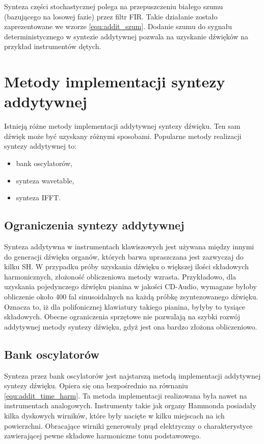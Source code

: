Synteza części stochastycznej polega na przepuszczeniu białego szumu (bazującego na losowej fazie) przez filtr FIR. Takie działanie zostało zaprezentowane we wzorze \ref{equ:addit_szum}.
Dodanie szumu do sygnału deterministycznego w syntezie addytywnej pozwala na uzyskanie dźwięków na przykład instrumentów dętych.

\section{Metody implementacji syntezy addytywnej}

Istnieją różne metody implementacji addytywnej syntezy dźwięku. Ten sam dźwięk może być uzyskany różnymi sposobami. Popularne metody realizacji syntezy addytywnej to:
\begin{itemize}
	\item bank oscylatorów,
	\item synteza wavetable,
	\item synteza IFFT.
\end{itemize}

\subsection{Ograniczenia syntezy addytywnej} \label{addit_ograniczenia}
Synteza addytywna w instrumentach klawiszowych jest używana między innymi do generacji dźwięku organów, których barwa upraszczana jest zazwyczaj do kilku SH. W przypadku próby uzyskania dźwięku o większej ilości składowych harmonicznych, złożoność obliczeniowa metody wzrasta.
Przykładowo, dla uzyskania pojedynczego dźwięku pianina w jakości CD-Audio,
wymagane byłoby obliczenie około 400 fal sinusoidalnych na każdą próbkę zsyntezowanego dźwięku. Oznacza to, iż dla polifonicznej klawiatury takiego pianina, byłyby to tysiące składowych. Obecne ograniczenia sprzętowe nie pozwalają na szybki rozwój addytywnej metody syntezy dźwięku, gdyż jest ona bardzo złożona obliczeniowo.

\subsection{Bank oscylatorów}
Synteza przez bank oscylatorów jest najstarszą metodą implementacji addytywnej syntezy dźwięku. Opiera się ona bezpośrednio na równaniu \ref{equ:addit_time_harm}.
Ta metoda implementacji realizowana była nawet na instrumentach analogowych. Instrumenty takie jak organy Hammonda posiadały kilka dyskowych wirników, które były nacięte w kilku miejscach na ich powierzchni. Obracające wirniki generowały prąd elektryczny o charakterystyce zawierającej pewne składowe harmoniczne tonu podstawowego.

